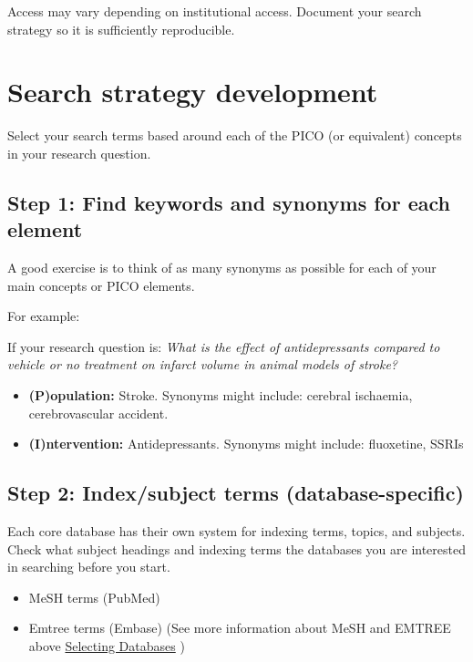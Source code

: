 \documentclass[
]{book}
\providecommand{\tightlist}{%
  \setlength{\itemsep}{0pt}\setlength{\parskip}{0pt}}
\begin{document}
Access may vary depending on institutional access. Document your search strategy so it is sufficiently reproducible.

\section{Search strategy development}\label{search-strategy-development}

Select your search terms based around each of the PICO (or equivalent) concepts in your research question.

\subsection{Step 1: Find keywords and synonyms for each element}\label{step-1-find-keywords-and-synonyms-for-each-element}

A good exercise is to think of as many synonyms as possible for each of your main concepts or PICO elements.

For example:

If your research question is: \emph{What is the effect of antidepressants compared to vehicle or no treatment on infarct volume in animal models of stroke?}

\begin{itemize}
\tightlist
\item
  \textbf{(P)opulation:} Stroke. Synonyms might include: cerebral ischaemia, cerebrovascular accident.
\item
  \textbf{(I)ntervention:} Antidepressants. Synonyms might include: fluoxetine, SSRIs
\end{itemize}

\subsection{Step 2: Index/subject terms (database-specific)}\label{step-2-indexsubject-terms-database-specific}

Each core database has their own system for indexing terms, topics, and subjects. Check what subject headings and indexing terms the databases you are interested in searching before you start.

\begin{itemize}
\tightlist
\item
  MeSH terms (PubMed)
\item
  Emtree terms (Embase)
  (See more information about MeSH and EMTREE above \hyperref[Selecting-Databases]{Selecting Databases} )
\end{itemize}
\end{document}

